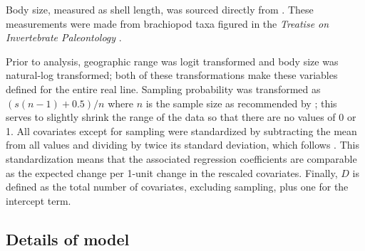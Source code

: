 \documentclass[11pt]{article}
\begin{document}
Body size, measured as shell length, was sourced directly from \citet{Payne2014}. These measurements were made from brachiopod taxa figured in the \textit{Treatise on Invertebrate Paleontology} \citep{Brunton2007}.



Prior to analysis, geographic range was logit transformed and body size was natural-log transformed; both of these transformations make these variables defined for the entire real line. Sampling probability was transformed as \((s (n - 1) + 0.5) / n\) where \(n\) is the sample size as recommended by \citet{Smithson2006}; this serves to slightly shrink the range of the data so that there are no values of 0 or 1. All covariates except for sampling were standardized by subtracting the mean from all values and dividing by twice its standard deviation, which follows \citet{Gelman2007}. This standardization means that the associated regression coefficients are comparable as the expected change per 1-unit change in the rescaled covariates. Finally, \(D\) is defined as the total number of covariates, excluding sampling, plus one for the intercept term.



\subsection*{Details of model}
\label{sec:model}
\end{document}
